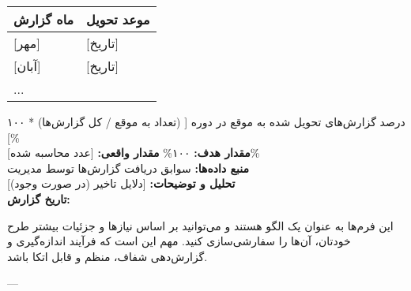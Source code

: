 \documentclass[11pt]{article}
\begin{document}
\bigskip
\begin{tabular}{ll}
\textbf{ماه گزارش} & \textbf{موعد تحویل} \\
\hline
{[مهر]} & {[تاریخ]} \\
{[آبان]} & {[تاریخ]} \\
... & \\
\end{tabular}
\bigskip

\noindent درصد گزارش‌های تحویل شده به موقع در دوره \hfill {[ (تعداد به موقع / کل گزارش‌ها) * ۱۰۰ ]\%} \\
\noindent\textbf{مقدار هدف:} ۱۰۰\% \hfill \textbf{مقدار واقعی:} {[عدد محاسبه شده]\%} \\
\noindent\textbf{منبع داده‌ها:} سوابق دریافت گزارش‌ها توسط مدیریت \\
\noindent\textbf{تحلیل و توضیحات:} {[دلایل تاخیر (در صورت وجود)]} \\
\noindent\textbf{تاریخ گزارش:} \\

\hrulefill
\bigskip

این فرم‌ها به عنوان یک الگو هستند و می‌توانید بر اساس نیازها و جزئیات بیشتر طرح خودتان، آن‌ها را سفارشی‌سازی کنید. مهم این است که فرآیند اندازه‌گیری و گزارش‌دهی شفاف، منظم و قابل اتکا باشد.
\bigskip

---
\end{document}
